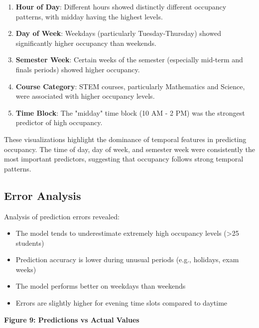 \documentclass[12pt,letterpaper]{article}
\begin{document}
\begin{enumerate}
    \item \textbf{Hour of Day}: Different hours showed distinctly different occupancy patterns, with midday having the highest levels.
    \item \textbf{Day of Week}: Weekdays (particularly Tuesday-Thursday) showed significantly higher occupancy than weekends.
    \item \textbf{Semester Week}: Certain weeks of the semester (especially mid-term and finals periods) showed higher occupancy.
    \item \textbf{Course Category}: STEM courses, particularly Mathematics and Science, were associated with higher occupancy levels.
    \item \textbf{Time Block}: The "midday" time block (10 AM - 2 PM) was the strongest predictor of high occupancy.
\end{enumerate}

These visualizations highlight the dominance of temporal features in predicting occupancy. The time of day, day of week, and semester week were consistently the most important predictors, suggesting that occupancy follows strong temporal patterns.

\subsection{Error Analysis}

Analysis of prediction errors revealed:

\begin{itemize}
    \item The model tends to underestimate extremely high occupancy levels (>25 students)
    \item Prediction accuracy is lower during unusual periods (e.g., holidays, exam weeks)
    \item The model performs better on weekdays than weekends
    \item Errors are slightly higher for evening time slots compared to daytime
\end{itemize}

\textbf{Figure 9: Predictions vs Actual Values}
\end{document}
